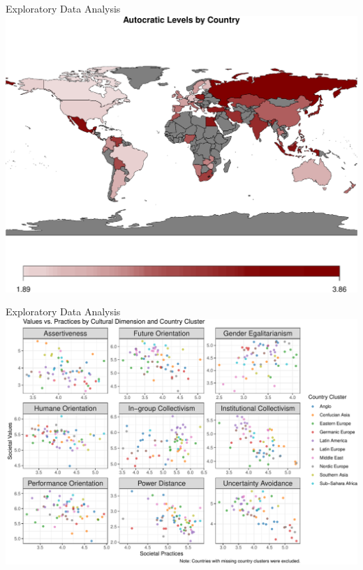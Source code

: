 \documentclass[
  ignorenonframetext,
]{beamer}
\begin{document}
\begin{frame}{Exploratory Data Analysis}
\protect\hypertarget{exploratory-data-analysis}{}
\includegraphics{final_slides_files/figure-beamer/eda_leader-1.pdf}
\end{frame}

\begin{frame}{Exploratory Data Analysis}
\protect\hypertarget{exploratory-data-analysis-1}{}
\includegraphics{final_slides_files/figure-beamer/eda_social-1.pdf}
\end{frame}
\end{document}
